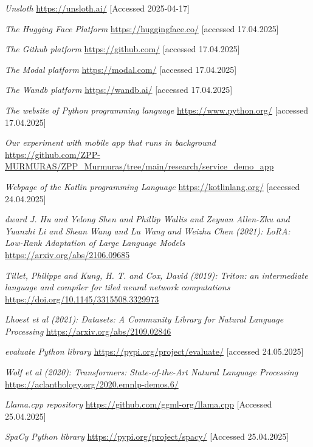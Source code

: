 \documentclass[licencjacka,en]{pracamgr}
\begin{document}
\begin{thebibliography}{199}
\textit{Unsloth}
\url{https://unsloth.ai/}
[Accessed 2025-04-17]

\textit{The Hugging Face Platform}
\url{https://huggingface.co/}
[accessed 17.04.2025]

\textit{The Github platform}
\url{https://github.com/}
[accessed 17.04.2025]

\textit{The Modal platform}
\url{https://modal.com/}
[accessed 17.04.2025]

\textit{The Wandb platform}
\url{https://wandb.ai/}
[accessed 17.04.2025]

\textit{The website of Python programming language}
\url{https://www.python.org/}
[accessed 17.04.2025]

\textit{Our experiment with mobile app that runs in background}
\url{https://github.com/ZPP-MURMURAS/ZPP_Murmuras/tree/main/research/service_demo_app}

\textit{Webpage of the Kotlin programming Language}
\url{https://kotlinlang.org/}
[accessed 24.04.2025]

\textit{dward J. Hu and Yelong Shen and Phillip Wallis and Zeyuan Allen-Zhu and Yuanzhi Li and Shean Wang and Lu Wang and Weizhu Chen (2021): LoRA: Low-Rank Adaptation of Large Language Models}
\url{https://arxiv.org/abs/2106.09685}

\textit{Tillet, Philippe and Kung, H. T. and Cox, David (2019): Triton: an intermediate language and compiler for tiled neural network computations}
\url{https://doi.org/10.1145/3315508.3329973}

\textit{Lhoest et al (2021): Datasets: A Community Library for Natural Language Processing}
\url{https://arxiv.org/abs/2109.02846}

\textit{evaluate Python library}
\url{https://pypi.org/project/evaluate/}
[accessed 24.05.2025]

\textit{Wolf et al (2020): Transformers: State-of-the-Art Natural Language Processing}
\url{https://aclanthology.org/2020.emnlp-demos.6/}

\textit{Llama.cpp repository}
\url{https://github.com/ggml-org/llama.cpp}
[Accessed 25.04.2025]

\textit{SpaCy Python library}
\url{https://pypi.org/project/spacy/}
[Accessed 25.04.2025]


\end{thebibliography}
\end{document}
